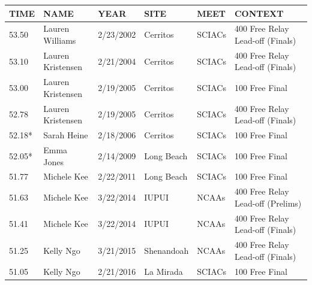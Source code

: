 \begin{table}[H]
\begin{minipage}[t]{0.48\textwidth}
\begin{tabular}{@{}p{1.8cm}p{2.8cm}p{1.2cm}p{1.4cm}p{1.4cm}p{2.0cm}@{}}
\hline
    \textbf{TIME} & \textbf{NAME} & \textbf{YEAR} & \textbf{SITE} & \textbf{MEET} & \textbf{CONTEXT} \\
\hline
    53.50 & Lauren Williams & 2/23/2002 & Cerritos & SCIACs & 400 Free Relay Lead-off (Finals) \\
    53.10 & Lauren Kristensen & 2/21/2004 & Cerritos & SCIACs & 400 Free Relay Lead-off (Finals) \\
    53.00 & Lauren Kristensen & 2/19/2005 & Cerritos & SCIACs & 100 Free Final \\
    52.78 & Lauren Kristensen & 2/19/2005 & Cerritos & SCIACs & 400 Free Relay Lead-off (Finals) \\
    52.18* & Sarah Heine & 2/18/2006 & Cerritos & SCIACs & 100 Free Final  \\
    52.05* & Emma Jones & 2/14/2009 & Long Beach & SCIACs & 100 Free Final  \\
    51.77 & Michele Kee & 2/22/2011 & Long Beach & SCIACs & 100 Free Final  \\
    51.63 & Michele Kee & 3/22/2014 & IUPUI & NCAAs & 400 Free Relay Lead-off (Prelims) \\
    51.41 & Michele Kee & 3/22/2014 & IUPUI & NCAAs & 400 Free Relay Lead-off (Finals) \\
    51.25 & Kelly Ngo & 3/21/2015 & Shenandoah & NCAAs & 400 Free Relay Lead-off (Finals) \\
    51.05 & Kelly Ngo & 2/21/2016 & La Mirada & SCIACs & 100 Free Final \\
\hline
\end{tabular}
\end{minipage}
\end{table}


